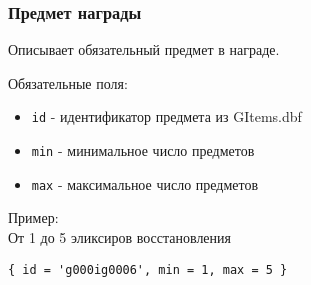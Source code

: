 \subsubsection{Предмет награды}
\label{item}
Описывает обязательный предмет в награде.

Обязательные поля:
\begin{itemize}
\item \texttt{id} - идентификатор предмета из GItems.dbf
\item \texttt{min} - минимальное число предметов
\item \texttt{max} - максимальное число предметов
\end{itemize}

Пример:\\
От 1 до 5 эликсиров восстановления\\
\begin{lstlisting}
{ id = 'g000ig0006', min = 1, max = 5 }
\end{lstlisting}